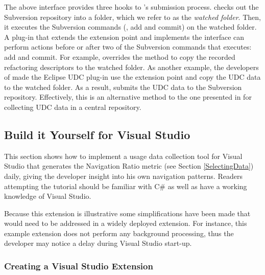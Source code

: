 The above interface provides three hooks to \CodingSpectator's submission
process. \CodingSpectator{} checks out the Subversion repository into a folder,
which we refer to as the \emph{watched folder}. Then, it executes the Subversion
commands (\eg, add and commit) on the watched folder. A plug-in that extends the
 extension point and implements the 
interface can perform actions before or after two of the Subversion commands that
\CodingSpectator{} executes: add and commit.
%
For example, \CodingSpectator{} overrides the method  to copy
the recorded refactoring descriptors to the watched folder. As another example,
the developers of \CodingSpectator{} made the Eclipse UDC plug-in use the
 extension point and copy the UDC data to the watched folder. As
a result, \CodingSpectator{} submits the UDC data to the Subversion repository.
Effectively, this is an alternative method to the one presented in
 for collecting UDC data in a central repository.

%
%


\subsection{Build it Yourself for Visual Studio}
\label{buildItYourself}

This section shows how to implement a usage data collection tool for Visual Studio that generates the Navigation Ratio metric (see Section \ref{SelectingData}) daily, giving the developer insight into his own navigation patterns. Readers attempting the tutorial should be familiar with C\# as well as have a working knowledge of Visual Studio.  

Because this extension is illustrative some simplifications have been made that would need to be addressed in a widely deployed extension. For instance, this example extension does not perform any background processing, thus the developer may notice a delay during Visual Studio start-up.  


\subsubsection{Creating a Visual Studio Extension}


